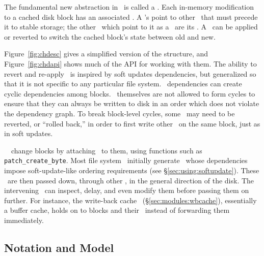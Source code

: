 The fundamental new abstraction in \Kudos\ is called a \chdesc. Each in-memory
modification to a cached disk block has an associated \chdesc. A \chdesc's
\emph{\befores} point to other \chdescs\ that must precede it to stable storage;
the other \chdescs\ which point to it as a \before\ are its \emph{\afters}. A
\chdesc\ can be applied or reverted to switch the cached block's state between
old and new.

Figure~\ref{fig:chdesc} gives a simplified version of the structure, and
Figure~\ref{fig:chdapi} shows much of the API for working with them. The ability
to revert and re-apply \chdescs\ is inspired by soft updates dependencies, but
generalized so that it is not specific to any particular file system. \Chdesc\
dependencies can create cyclic dependencies among blocks. \Chdescs\ themselves
are not allowed to form cycles to ensure that they can always be written to disk
in an order which does not violate the dependency graph. To break block-level
cycles, some \chdescs\ may need to be reverted, or ``rolled back,'' in order to
first write other \chdescs\ on the same block, just as in soft updates.

\Kudos\ \modules\ change blocks by attaching \chdescs\ to them, using functions
such as \texttt{patch\_create\_byte}. Most file system \modules\ initially
generate \chdescs\ whose dependencies impose soft-update-like ordering
requirements (see \S\ref{sec:using:softupdate}). These \chdescs\ are then passed
down, through other \modules, in the general direction of the disk. The
intervening \modules\ can inspect, delay, and even modify them before passing
them on further. For instance, the write-back cache \module\
(\S\ref{sec:modules:wbcache}), essentially a buffer cache, holds on to blocks
and their \chdescs\ instead of forwarding them immediately.

\subsection{Notation and Model}
\label{sec:chdescs:notation}

\newcommand{\ChAll}{\ensuremath{All}}
\newcommand{\ChAllB}[1]{\ensuremath{All[#1]}}
\newcommand{\ChMem}{\ensuremath{Mem}}
\newcommand{\ChMemB}[1]{\ensuremath{Mem[#1]}}
\newcommand{\ChDisk}{\ensuremath{Disk}}
\newcommand{\ChDiskB}[1]{\ensuremath{Disk[#1]}}
\newcommand{\ChInf}{\ensuremath{Inf}}
\newcommand{\ChInfB}[1]{\ensuremath{Inf[#1]}}

\newcommand{\statenone}{\ensuremath{none}}
\newcommand{\stateinf}{\ensuremath{inflight}}
\newcommand{\statedisk}{\ensuremath{ondisk}}

